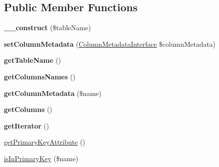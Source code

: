 \subsection*{Public Member Functions}
\begin{DoxyCompactItemize}
\item 
\mbox{\label{class_pes_1_1_database_1_1_metadata_1_1_table_metadata_abacaeba292820b532d3136d26c48a2e6}} 
{\bfseries \+\_\+\+\_\+construct} (\$table\+Name)
\item 
\mbox{\label{class_pes_1_1_database_1_1_metadata_1_1_table_metadata_ac4b8889fba0a535bb46883de6d34af8a}} 
{\bfseries set\+Column\+Metadata} (\mbox{\hyperlink{interface_pes_1_1_database_1_1_metadata_1_1_column_metadata_interface}{Column\+Metadata\+Interface}} \$column\+Metadata)
\item 
\mbox{\label{class_pes_1_1_database_1_1_metadata_1_1_table_metadata_a93566f2c8d709d410ae8ec46b813999b}} 
{\bfseries get\+Table\+Name} ()
\item 
\mbox{\label{class_pes_1_1_database_1_1_metadata_1_1_table_metadata_a582c667a96e83795a420f4c6bf504181}} 
{\bfseries get\+Columns\+Names} ()
\item 
\mbox{\label{class_pes_1_1_database_1_1_metadata_1_1_table_metadata_a52237cd3951ae6b7b9d146a0901e7941}} 
{\bfseries get\+Column\+Metadata} (\$name)
\item 
\mbox{\label{class_pes_1_1_database_1_1_metadata_1_1_table_metadata_a6287262cb9628d7a89d8fc16dcb51177}} 
{\bfseries get\+Columns} ()
\item 
\mbox{\label{class_pes_1_1_database_1_1_metadata_1_1_table_metadata_a7a9f937c2958e6f4dd7b030f86fb70b7}} 
{\bfseries get\+Iterator} ()
\item 
\mbox{\hyperlink{class_pes_1_1_database_1_1_metadata_1_1_table_metadata_acdf7b4be99c95a784e8cdff4d786ec95}{get\+Primary\+Key\+Attribute}} ()
\item 
\mbox{\hyperlink{class_pes_1_1_database_1_1_metadata_1_1_table_metadata_a7e2d4a66a462b1bc3bf070fed88ee5f7}{is\+In\+Primary\+Key}} (\$name)
\end{DoxyCompactItemize}


